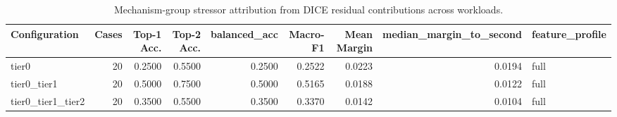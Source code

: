 \begin{table}[t]
\centering
\caption{Mechanism-group stressor attribution from DICE residual contributions across workloads.}
\label{tab:dice_stressor_diagnosis}
\footnotesize
\begin{tabular}{lrrrrrrrl}
\toprule
Configuration & Cases & Top-1 Acc. & Top-2 Acc. & balanced_acc & Macro-F1 & Mean Margin & median_margin_to_second & feature_profile \\
\midrule
tier0 & 20 & 0.2500 & 0.5500 & 0.2500 & 0.2522 & 0.0223 & 0.0194 & full \\
tier0_tier1 & 20 & 0.5000 & 0.7500 & 0.5000 & 0.5165 & 0.0188 & 0.0122 & full \\
tier0_tier1_tier2 & 20 & 0.3500 & 0.5500 & 0.3500 & 0.3370 & 0.0142 & 0.0104 & full \\
\bottomrule
\end{tabular}

\end{table}
